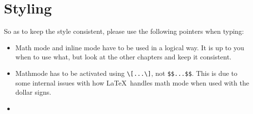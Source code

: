 \documentclass[a4paper]{article}
\begin{document}
\section{Styling}
So as to keep the style consistent, please use the following pointers when typing:
\begin{itemize}
	\item Math mode and inline mode have to be used in a logical way. It is up to you when to use what, but look at the other chapters and keep it consistent.
\item Mathmode has to be activated using \verb+\[...\]+, not \verb+$$...$$+. This is due to some internal issues with how \LaTeX~handles math mode when used with the dollar signs.
\item 
\end{itemize}
\end{document}
